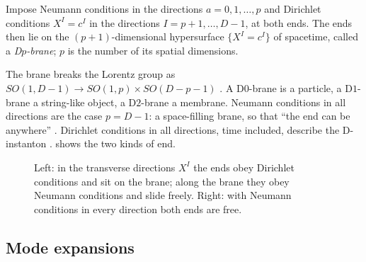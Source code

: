 \begin{definition}[D$p$-brane]\label{def:dbranes:Dp}
Impose Neumann conditions in the directions $a=0,1,\dots,p$ and Dirichlet conditions
$X^I=c^I$ in the directions $I=p+1,\dots,D-1$, at both ends. The ends then lie on the
$(p+1)$-dimensional hypersurface $\{X^I=c^I\}$ of spacetime, called a \emph{D$p$-brane}; $p$ is
the number of its spatial dimensions.
\end{definition}

The brane breaks the Lorentz group as $SO(1,D-1)\to SO(1,p)\times SO(D-p-1)$
. A D$0$-brane is a particle, a D$1$-brane a string-like object, a
D$2$-brane a membrane. Neumann conditions in all directions are the case $p=D-1$: a
space-filling brane, so that ``the end can be anywhere'' .
Dirichlet conditions in all directions, time included, describe the D-instanton .
 shows the two kinds of end.

\begin{figure}[ht]
\centering
{}
\caption{Left: in the transverse directions $X^I$ the ends obey Dirichlet conditions and sit on
the brane; along the brane they obey Neumann conditions and slide freely. Right: with Neumann
conditions in every direction both ends are free.}\label{fig:dbranes:ND}
\end{figure}

\subsection{Mode expansions}


